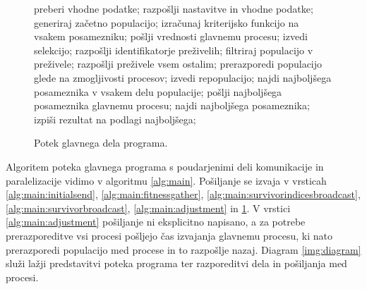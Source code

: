 \documentclass[a4paper,12pt]{book}
\begin{document}
\let\oldfigurename\figurename
\renewcommand{\figurename}{Algoritem}
\begin{figure}
\caption{Potek glavnega dela programa. }
\label{alg:main}
\begin{algorithmic}[1]
		\State preberi vhodne podatke;
		\State razpošlji nastavitve in vhodne podatke; \label{alg:main:initialsend}
	\EndIf
	\State generiraj začetno populacijo;
		\State izračunaj kriterijsko funkcijo na vsakem posamezniku;
		\State pošlji vrednosti glavnemu procesu; \label{alg:main:fitnessgather}
			\State izvedi selekcijo;
			\State razpošlji identifikatorje preživelih; \label{alg:main:survivorindicesbroadcast}
		\EndIf
		\State filtriraj populacijo v preživele;
		\State razpošlji preživele vsem ostalim; \label{alg:main:survivorbroadcast}
		\State prerazporedi populacijo glede na zmogljivosti procesov; \label{alg:main:adjustment}
		\State izvedi repopulacijo;
	\EndFor
	\State najdi najboljšega posameznika v vsakem delu populacije;
	\State pošlji najboljšega posameznika glavnemu procesu; \label{alg:main:bestbroadcast}
		\State najdi najboljšega posameznika;
		\State izpiši rezultat na podlagi najboljšega;
	\EndIf
\EndFunction
\end{algorithmic}
\end{figure}
\let\figurename\oldfigurename

Algoritem poteka glavnega programa s poudarjenimi deli komunikacije in paralelizacije vidimo v algoritmu \ref{alg:main}. Pošiljanje se izvaja v vrsticah \ref{alg:main:initialsend}, \ref{alg:main:fitnessgather}, \ref{alg:main:survivorindicesbroadcast}, \ref{alg:main:survivorbroadcast}, \ref{alg:main:adjustment} in \ref{alg:main:bestbroadcast}. V vrstici \ref{alg:main:adjustment} pošiljanje ni eksplicitno napisano, a za potrebe prerazporeditve vsi procesi pošljejo čas izvajanja glavnemu procesu, ki nato prerazporedi populacijo med procese in to razpošlje nazaj. Diagram \ref{img:diagram} služi lažji predstavitvi poteka programa ter razporeditvi dela in pošiljanja med procesi. 
\end{document}
